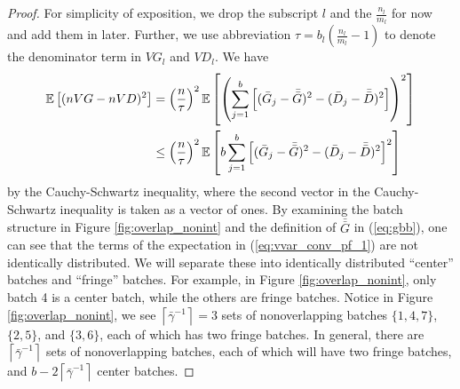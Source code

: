 \documentclass[12pt]{article}
\newcommand{\e}[1]{\mathbb{E} \left[ #1 \right]
}
\newcommand{\nbl}{b_l}
\newcommand{\gammab}{\bar{\gamma}}
\newcommand{\gb}{\bar{G}}
\newcommand{\gbb}{\bar{\gb}}
\newcommand{\db}{\bar{D}}
\newcommand{\dbb}{\bar{\db}}
\begin{document}
\begin{proof}
	For simplicity of exposition, we drop the subscript $l$ and the $\frac{n_l}{m_l}$ for now and add them in later.  
        Further, we use abbreviation $\tau = \nbl \left(\tfrac{n_l}{m_l} - 1\right)$ to denote the denominator term in $VG_l$ and $VD_l$. We have
	\begin{align}
		\e{(nVG - nVD)^2} & = \left( \frac{n}{\tau} \right)^2 \e{ \left( \sum_{j=1}^{b} \left[ (\gb_j - \gbb)^2 - (\db_j - \dbb)^2 \right] \right)^2 } \notag \\
		& \leq \left( \frac{n}{\tau} \right)^2 \e{ b \sum_{j=1}^{b} \left[ (\gb_j - \gbb)^2 - (\db_j - \dbb)^2 \right]^2 } \label{eq:vvar_conv_pf_1}
	\end{align}
	by the Cauchy-Schwartz inequality, where the second vector in the Cauchy-Schwartz inequality is taken as a vector of ones.  
        By examining the batch structure in Figure \ref{fig:overlap_nonint} and the definition of $\gbb$ in (\ref{eq:gbb}), one can see that the terms of the expectation in (\ref{eq:vvar_conv_pf_1}) are not identically distributed.  
        We will separate these into identically distributed ``center'' batches and ``fringe'' batches.  
        For example, in Figure \ref{fig:overlap_nonint}, only batch 4 is a center batch, while the others are fringe batches.  
        Notice in Figure \ref{fig:overlap_nonint}, we see $\left\lceil \gammab^{-1} \right\rceil = 3$ sets of nonoverlapping batches $\{1,4,7\}$, $\{2,5\}$, and $\{3,6\}$, each of which has two fringe batches.  
        In general, there are $\left\lceil \gammab^{-1} \right\rceil$ sets of nonoverlapping batches, each of which will have two fringe batches, and $b - 2\left\lceil \gammab^{-1} \right\rceil$ center batches.
	

\end{proof}
\end{document}
